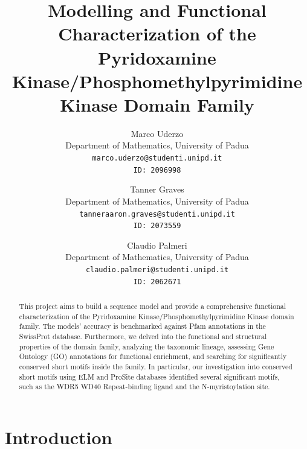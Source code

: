 \documentclass[10pt,twocolumn,letterpaper]{article}
\begin{document}

\title{Modelling and Functional Characterization of the Pyridoxamine Kinase/Phosphomethylpyrimidine Kinase Domain Family}

\author{
Marco Uderzo\\
{\small Department of Mathematics, University of Padua}\\
{\tt\small marco.uderzo@studenti.unipd.it}\\
{\tt\small ID: 2096998} \\
\and
Tanner Graves\\
{\small Department of Mathematics, University of Padua}\\
{\tt\small tanneraaron.graves@studenti.unipd.it}\\
{\tt\small ID: 2073559} \\
\and
Claudio Palmeri \\
{\small Department of Mathematics, University of Padua}\\
{\tt\small claudio.palmeri@studenti.unipd.it}\\
{\tt\small ID: 2062671} \\
}


\maketitle


\begin{abstract}
    This project aims to build a sequence model and provide a comprehensive functional characterization of the Pyridoxamine Kinase/Phosphomethylpyrimidine Kinase domain family. The models' accuracy is benchmarked against Pfam annotations in the SwissProt database. Furthermore, we delved into the functional and structural properties of the domain family, analyzing the taxonomic lineage, assessing Gene Ontology (GO) annotations for functional enrichment, and searching for significantly conserved short motifs inside the family. In particular, our investigation into conserved short motifs using ELM and ProSite databases identified several significant motifs, such as the WDR5 WD40 Repeat-binding ligand and the N-myristoylation site.
\end{abstract}

\section{Introduction}
\end{document}
